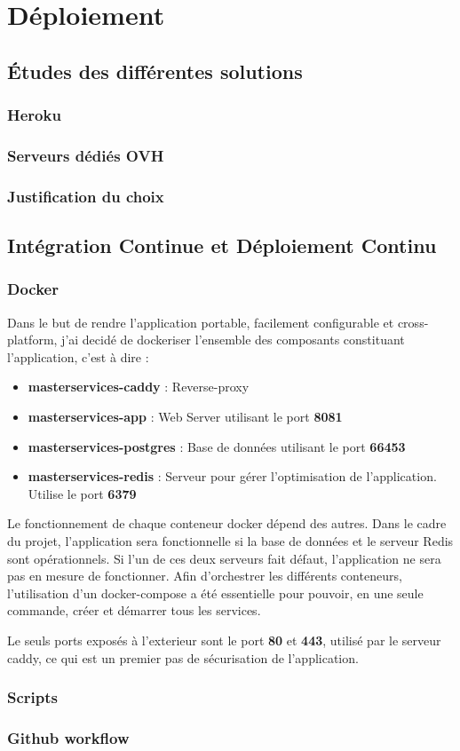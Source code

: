 \section{Déploiement}
\subsection{Études des différentes solutions}
\subsubsection{Heroku}
\subsubsection{Serveurs dédiés OVH}
\subsubsection{Justification du choix}
\subsection{Intégration Continue et Déploiement Continu}
\subsubsection{Docker}
Dans le but de rendre l'application portable, facilement configurable et cross-platform, j'ai decidé de dockeriser l'ensemble des composants constituant l'application, c'est à dire :
\begin{itemize}
    \item \textbf{masterservices-caddy} : Reverse-proxy
    \item \textbf{masterservices-app} : Web Server utilisant le port \textbf{8081}
    \item \textbf{masterservices-postgres} : Base de données utilisant le port \textbf{66453}
    \item \textbf{masterservices-redis} : Serveur pour gérer l'optimisation de l'application. Utilise le port \textbf{6379}
\end{itemize}
Le fonctionnement de chaque conteneur docker dépend des autres. Dans le cadre du projet, l'application sera fonctionnelle si la base de données et le serveur Redis sont opérationnels. Si l'un de ces deux serveurs fait défaut, l'application ne sera pas en mesure de fonctionner. 
Afin d'orchestrer les différents conteneurs, l'utilisation d'un docker-compose a été essentielle pour pouvoir, en une seule commande, créer et démarrer tous les services. 

Le seuls ports exposés à l'exterieur sont le port \textbf{80} et \textbf{443}, utilisé par le serveur caddy, ce qui est un premier pas de sécurisation de l'application. 
\subsubsection{Scripts}
\subsubsection{Github workflow}
